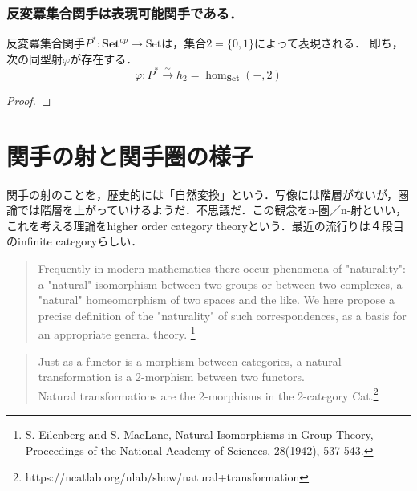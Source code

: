 \documentclass[uplatex, 12pt, dvipdfmx]{jsreport}
\begin{document}
\subsection{反変冪集合関手は表現可能関手である．}

\begin{proposition}[$P^*$ is represented by 2]
    反変冪集合関手$P^*:\mathbf{Set}^{op}\to\mathrm{Set}$は，集合$2=\{ 0, 1\}$によって表現される．
    即ち，次の同型射$\varphi$が存在する．
    $$\varphi : P^*\xrightarrow{\sim} h_2=\hom_{\mathbf{Set}}(-,2)$$
\end{proposition}
\begin{proof}
    
\end{proof}

\chapter{関手の射と関手圏の様子}
関手の射のことを，歴史的には「自然変換」という．写像には階層がないが，圏論では階層を上がっていけるようだ．不思議だ．この観念をn-圏／n-射といい，これを考える理論をhigher order category theoryという．最近の流行りは４段目のinfinite categoryらしい．
\begin{quote}Frequently in modern mathematics there occur phenomena of "naturality": a "natural" isomorphism between two groups or between two complexes, a "natural" homeomorphism of two spaces and the like. We here propose a precise definition of the "naturality" of such correspondences, as a basis for an appropriate general theory. \footnote{S. Eilenberg and S. MacLane, Natural Isomorphisms in Group Theory, Proceedings of the National Academy of Sciences, 28(1942), 537-543.}\end{quote}

\begin{quote}Just as a functor is a morphism between categories, a natural transformation is a 2-morphism between two functors. \\ Natural transformations are the 2-morphisms in the 2-category Cat.\footnote{https://ncatlab.org/nlab/show/natural+transformation}\end{quote}
\end{document}
